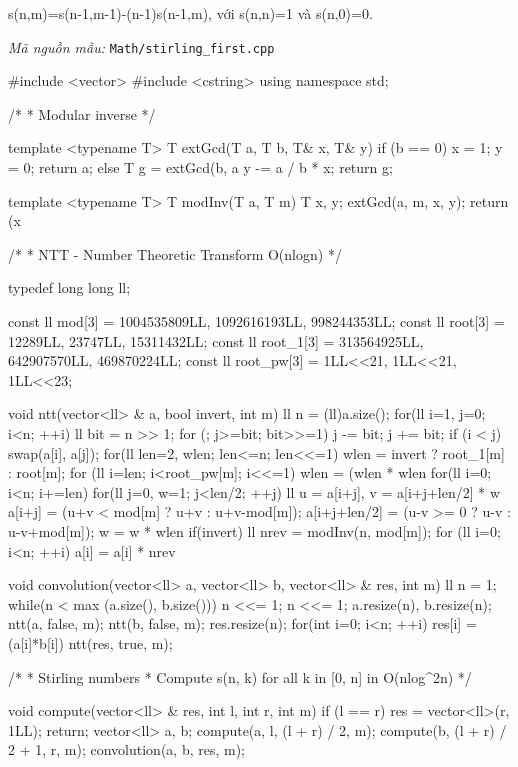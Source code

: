 \documentclass[11pt]{article}
\newcommand{\codepath}[1]{\par\noindent\textit{Mã nguồn mẫu:} \texttt{#1}\par}
\begin{document}
s(n,m)=s(n-1,m-1)-(n-1)s(n-1,m), với s(n,n)=1 và s(n,0)=0.

\codepath{Math/stirling\_first.cpp}

\begingroup\scriptsize
\begin{vncode}
#include <vector>
#include <cstring>
using namespace std;

/*
 * Modular inverse
 */

template <typename T>
T extGcd(T a, T b, T& x, T& y) {
    if (b == 0) {
        x = 1; y = 0;
        return a;
    }
    else {
        T g = extGcd(b, a %
        y -= a / b * x;
        return g;
    }
}
 
template <typename T>
T modInv(T a, T m) {
    T x, y;
    extGcd(a, m, x, y);
    return (x %
}

/*
 * NTT - Number Theoretic Transform O(nlogn)
 */

typedef long long ll;

const ll mod[3] = {1004535809LL, 1092616193LL, 998244353LL};
const ll root[3] = {12289LL, 23747LL, 15311432LL};
const ll root_1[3] = {313564925LL, 642907570LL, 469870224LL};
const ll root_pw[3] = {1LL<<21, 1LL<<21, 1LL<<23};

void ntt(vector<ll> & a, bool invert, int m) {
	ll n = (ll)a.size();
	for(ll i=1, j=0; i<n; ++i) {
		ll bit = n >> 1;
		for (; j>=bit; bit>>=1) j -= bit;
		j += bit;
		if (i < j) swap(a[i], a[j]);
	}
	for(ll len=2, wlen; len<=n; len<<=1) {
		wlen = invert ? root_1[m] : root[m];
		for (ll i=len; i<root_pw[m]; i<<=1)
			wlen = (wlen * wlen %
		for(ll i=0; i<n; i+=len) {
			for(ll j=0, w=1; j<len/2; ++j) {
				ll u = a[i+j],  v = a[i+j+len/2] * w %
				a[i+j] = (u+v < mod[m] ? u+v : u+v-mod[m]);
				a[i+j+len/2] = (u-v >= 0 ? u-v : u-v+mod[m]);
				w = w * wlen %
			}
		}
	}
	if(invert) {
		ll nrev = modInv(n, mod[m]);
		for (ll i=0; i<n; ++i)
			a[i] = a[i] * nrev %
	}
}

void convolution(vector<ll> a, vector<ll> b, vector<ll> & res, int m) {
	ll n = 1;
	while(n < max (a.size(), b.size())) n <<= 1;
	n <<= 1;
	a.resize(n), b.resize(n);
	ntt(a, false, m); ntt(b, false, m);
	res.resize(n);
	for(int i=0; i<n; ++i) res[i] = (a[i]*b[i])%
	ntt(res, true, m);
}

/*
 * Stirling numbers
 * Compute s(n, k) for all k in [0, n] in O(nlog^2n) 
 */

void compute(vector<ll> & res, int l, int r, int m) {
	if (l == r) {
		res = vector<ll>({r, 1LL});
		return;
	}
	vector<ll> a, b;
	compute(a, l, (l + r) / 2, m);
	compute(b, (l + r) / 2 + 1, r, m);
	convolution(a, b, res, m);
}


\end{vncode}
\end{document}
